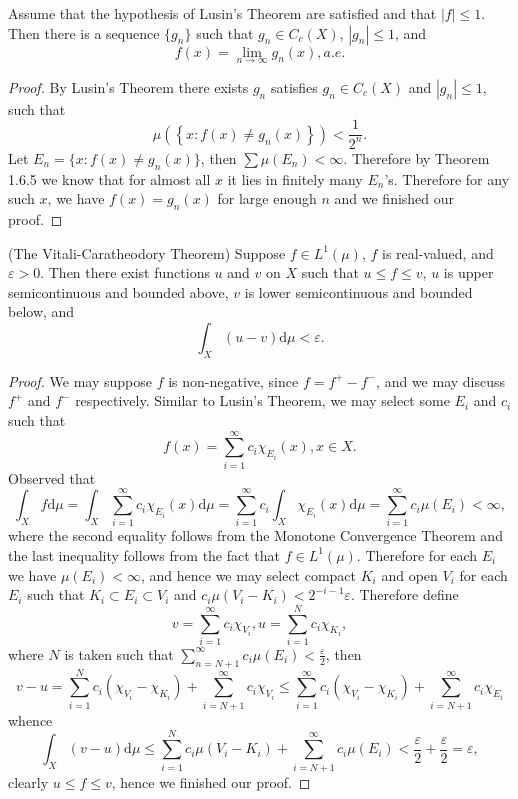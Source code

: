 \begin{corollary}
Assume that the hypothesis of Lusin's Theorem are satisfied and that $|f|\le 1$. Then there is a sequence $\{g_n\}$ such that $g_n\in C_c(X)$, $|g_n|\le 1$, and 
$$f(x)=\lim_{n\to\infty}g_n(x),a.e.$$
\end{corollary}
\begin{proof}
By Lusin's Theorem there exists $g_n$ satisfies $g_n\in C_c(X)$ and $|g_n|\le 1$, such that 
$$
\mu \left( \left\{ x:f\left( x \right) \ne g_n\left( x \right) \right\} \right) <\frac{1}{2^n}.
$$
Let $E_n=\{x:f(x)\ne g_n(x)\}$, then $\sum\mu(E_n)<\infty$. Therefore by Theorem 1.6.5 we know that for almost all $x$ it lies in finitely many $E_n$'s. Therefore for any such $x$, we have $f(x)=g_n(x)$ for large enough $n$ and we finished our proof.
\end{proof}
\begin{theorem}(The Vitali-Caratheodory Theorem)
Suppose $f\in L^1(\mu)$, $f$ is real-valued, and $\varepsilon>0$. Then there exist functions $u$ and $v$ on $X$ such that $u\le f\le v$, $u$ is upper semicontinuous and bounded above, $v$ is lower semicontinuous and bounded below, and 
$$\int_X(u-v)\mathrm{d}\mu<\varepsilon.$$
\end{theorem}
\begin{proof}
We may suppose $f$ is non-negative, since $f=f^+-f^-$, and we may discuss $f^+$ and $f^-$ respectively. Similar to Lusin's Theorem, we may select some $E_i$ and $c_i$ such that 
$$
f\left( x \right) =\sum_{i=1}^{\infty}{c_i\chi _{E_i}\left( x \right)},x\in X.
$$
Observed that 
$$
\int_X{f\mathrm{d}\mu}=\int_X{\sum_{i=1}^{\infty}{c_i\chi _{E_i}\left( x \right)}\mathrm{d}\mu}=\sum_{i=1}^{\infty}{c_i\int_X{\chi _{E_i}\left( x \right) \mathrm{d}\mu}}=\sum_{i=1}^{\infty}{c_i\mu \left( E_i \right)}<\infty ,
$$
where the second equality follows from the Monotone Convergence Theorem and the last inequality follows from the fact that $f\in L^1(\mu)$. Therefore for each $E_i$ we have $\mu(E_i)<\infty$, and hence we may select compact $K_i$ and open $V_i$ for each $E_i$ such that $K_i\subset E_i\subset V_i$ and $c_i\mu(V_i-K_i)<2^{-i-1}\varepsilon$. Therefore define 
$$
v=\sum_{i=1}^{\infty}{c_i\chi _{V_i}},u=\sum_{i=1}^N{c_i\chi _{K_i}},
$$
where $N$ is taken such that $\sum_{n=N+1}^{\infty}{c_i\mu \left( E_i \right)}<\frac{\varepsilon}{2}$, then 
$$
v-u=\sum_{i=1}^N{c_i\left( \chi _{V_i}-\chi _{K_i} \right)}+\sum_{i=N+1}^{\infty}{c_i\chi _{V_i}}\le \sum_{i=1}^{\infty}{c_i\left( \chi _{V_i}-\chi _{K_i} \right)}+\sum_{i=N+1}^{\infty}{c_i\chi _{E_i}}
$$
whence 
$$
\int_X{\left( v-u \right) \mathrm{d}\mu}\le \sum_{i=1}^N{c_i\mu \left( V_i-K_i \right)}+\sum_{i=N+1}^{\infty}{c_i\mu \left( E_i \right)}<\frac{\varepsilon}{2}+\frac{\varepsilon}{2}=\varepsilon ,
$$
clearly $u\le f\le v$, hence we finished our proof.
\end{proof}

